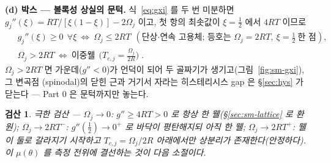 \documentclass[11pt,a4paper]{article}
\newtheorem*{verifybox}{검산}
\begin{document}
\textbf{(d) 박스 --- 볼록성 상실의 문턱.} 식~\eqref{eq:gxi} 를 두 번 미분하면
$g_j''(\xi)=RT/[\xi(1-\xi)]-2\Omega_j$ 이고, 첫 항의 최솟값이 $\xi=\tfrac12$ 에서 $4RT$ 이므로
\begin{equation}
\boxed{\;
\begin{aligned}
&g_j''(\xi)\ge0\ \ \forall\xi\ \Longleftrightarrow\ \Omega_j\le2RT\ \ (\text{단상·연속 고용체; 등호는 }\Omega_j{=}2RT,\ \xi{=}\tfrac12\ \text{한 점}),\\
&\Omega_j>2RT\ \Longleftrightarrow\ \text{이중웰}\ \ \Big(T_{c,j}=\frac{\Omega_j}{2R}\Big)\;.
\end{aligned}}
\label{eq:sm-thresh}
\end{equation}
$\Omega_j>2RT$ 면 가운데($g''<0$)가 언덕이 되어 두 골짜기가 생기고(그림~\ref{fig:sm-gxi}), 그 변곡점
(spinodal)의 닫힌 근과 거기서 자라는 히스테리시스 gap 은 \S\ref{sec:hys} 가 닫는다 --- Part 0 은 문턱까지만
놓는다.
\begin{verifybox}
극한 검산 --- $\Omega_j\to0$: $g''\ge4RT>0$ 로 항상 한 웰(\S\ref{sec:sm-lattice} 로 환원);
$\Omega_j\to2RT^-$: $g''(\tfrac12)\to0^+$ 로 바닥이 평탄해지되 아직 한 웰; $\Omega_j\to2RT^+$: 웰이 둘로
갈라지기 시작하고 $T_{c,j}=\Omega_j/2R$ 아래에서만 상분리가 존재한다(안정하다). 이 $\mu(\theta)$ 를 측정 전위에 결선하는
것이 다음 소절이다.
\end{verifybox}
\end{document}
